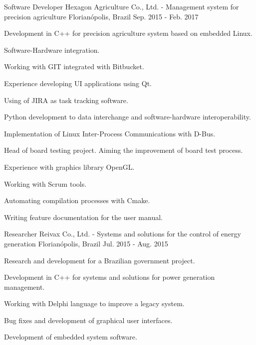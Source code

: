\begin{cventries}
  \cventry
    {Software Developer} %
    {Hexagon Agriculture Co., Ltd. - Management system for precision agriculture} %
    {Florianópolis, Brazil} %
    {Sep. 2015 - Feb. 2017} %
    {
      \begin{cvitems} %
        \item {Development in C++ for precision agriculture system based on embedded Linux.}
        \item {Software-Hardware integration.}
        \item {Working with GIT integrated with Bitbucket.}
        \item {Experience developing UI applications using Qt.}
        \item {Using of JIRA as task tracking software.}
        \item {Python development to data interchange and software-hardware interoperability.}
        \item {Implementation of Linux Inter-Process Communications with D-Bus.}
        \item {Head of board testing project. Aiming the improvement of board test process.}
        \item {Experience with graphics library OpenGL.}
        \item {Working with Scrum tools.}
        \item {Automating compilation processes with Cmake.}
        \item {Writing feature documentation for the user manual.}
      \end{cvitems}
    }

  \cventry
    {Researcher} %
    {Reivax Co., Ltd. - Systems and solutions for the control of energy generation} %
    {Florianópolis, Brazil} %
    {Jul. 2015 - Aug. 2015} %
    {
      \begin{cvitems} %
        \item {Research and development for a Brazilian government project.}
        \item {Development in C++ for systems and solutions for power generation management.}
        \item {Working with Delphi language to improve a legacy system.}
        \item {Bug fixes and development of graphical user interfaces.}
        \item {Development of embedded system software.}
      \end{cvitems}
    }


\end{cventries}
